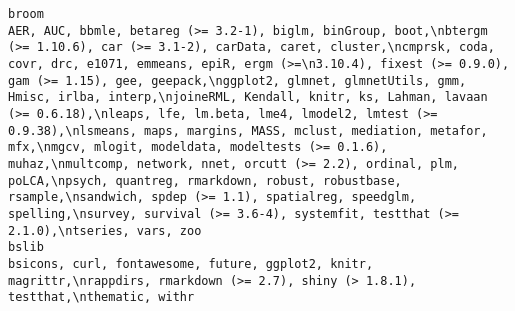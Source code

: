 \documentclass[
  letterpaper,
  DIV=11,
  numbers=noendperiod]{scrreprt}
\begin{document}
\begin{verbatim}
broom                                                                                                                                                                                                                                                                                                                                                                                                                                                                               AER, AUC, bbmle, betareg (>= 3.2-1), biglm, binGroup, boot,\nbtergm (>= 1.10.6), car (>= 3.1-2), carData, caret, cluster,\ncmprsk, coda, covr, drc, e1071, emmeans, epiR, ergm (>=\n3.10.4), fixest (>= 0.9.0), gam (>= 1.15), gee, geepack,\nggplot2, glmnet, glmnetUtils, gmm, Hmisc, irlba, interp,\njoineRML, Kendall, knitr, ks, Lahman, lavaan (>= 0.6.18),\nleaps, lfe, lm.beta, lme4, lmodel2, lmtest (>= 0.9.38),\nlsmeans, maps, margins, MASS, mclust, mediation, metafor, mfx,\nmgcv, mlogit, modeldata, modeltests (>= 0.1.6), muhaz,\nmultcomp, network, nnet, orcutt (>= 2.2), ordinal, plm, poLCA,\npsych, quantreg, rmarkdown, robust, robustbase, rsample,\nsandwich, spdep (>= 1.1), spatialreg, speedglm, spelling,\nsurvey, survival (>= 3.6-4), systemfit, testthat (>= 2.1.0),\ntseries, vars, zoo
bslib                                                                                                                                                                                                                                                                                                                                                                                                                                                                                                                                                                                                                                                                                                                                                                                                                                                                                                                                                                                                                                                                                                                                                                bsicons, curl, fontawesome, future, ggplot2, knitr, magrittr,\nrappdirs, rmarkdown (>= 2.7), shiny (> 1.8.1), testthat,\nthematic, withr

\end{verbatim}
\end{document}
